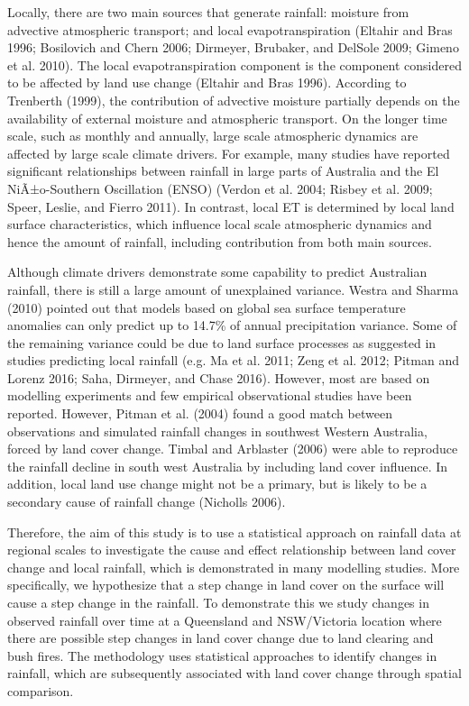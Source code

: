 \documentclass[fleqn,10pt,lineno]{wlpeerj} %
\begin{document}
Locally, there are two main sources that generate rainfall: moisture
from advective atmospheric transport; and local evapotranspiration
(Eltahir and Bras 1996; Bosilovich and Chern 2006; Dirmeyer, Brubaker,
and DelSole 2009; Gimeno et al. 2010). The local evapotranspiration
component is the component considered to be affected by land use change
(Eltahir and Bras 1996). According to Trenberth (1999), the contribution
of advective moisture partially depends on the availability of external
moisture and atmospheric transport. On the longer time scale, such as
monthly and annually, large scale atmospheric dynamics are affected by
large scale climate drivers. For example, many studies have reported
significant relationships between rainfall in large parts of Australia
and the El NiÃ±o-Southern Oscillation (ENSO) (Verdon et al. 2004; Risbey
et al. 2009; Speer, Leslie, and Fierro 2011). In contrast, local ET is
determined by local land surface characteristics, which influence local
scale atmospheric dynamics and hence the amount of rainfall, including
contribution from both main sources.

Although climate drivers demonstrate some capability to predict
Australian rainfall, there is still a large amount of unexplained
variance. Westra and Sharma (2010) pointed out that models based on
global sea surface temperature anomalies can only predict up to 14.7\%
of annual precipitation variance. Some of the remaining variance could
be due to land surface processes as suggested in studies predicting
local rainfall (e.g. Ma et al. 2011; Zeng et al. 2012; Pitman and Lorenz
2016; Saha, Dirmeyer, and Chase 2016). However, most are based on
modelling experiments and few empirical observational studies have been
reported. However, Pitman et al. (2004) found a good match between
observations and simulated rainfall changes in southwest Western
Australia, forced by land cover change. Timbal and Arblaster (2006) were
able to reproduce the rainfall decline in south west Australia by
including land cover influence. In addition, local land use change might
not be a primary, but is likely to be a secondary cause of rainfall
change (Nicholls 2006).

Therefore, the aim of this study is to use a statistical approach on
rainfall data at regional scales to investigate the cause and effect
relationship between land cover change and local rainfall, which is
demonstrated in many modelling studies. More specifically, we
hypothesize that a step change in land cover on the surface will cause a
step change in the rainfall. To demonstrate this we study changes in
observed rainfall over time at a Queensland and NSW/Victoria location
where there are possible step changes in land cover change due to land
clearing and bush fires. The methodology uses statistical approaches to
identify changes in rainfall, which are subsequently associated with
land cover change through spatial comparison.
\end{document}

